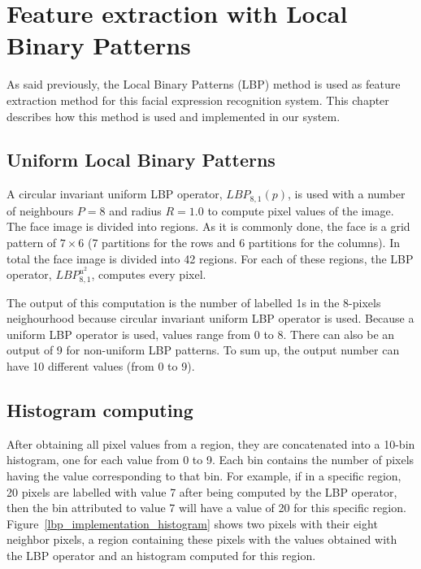 \chapter{Feature extraction with Local Binary Patterns}
\label{chap:implementation_lbp}

\noindent As said previously, the Local Binary Patterns (LBP) method is used as feature extraction method for this facial expression recognition system. This chapter describes how this method is used and implemented in our system.
\newline

\section{Uniform Local Binary Patterns}

\vspace{\baselineskip}
\noindent A circular invariant uniform LBP operator, $ LBP_{8,1}(p) $, is used with a number of neighbours $ P = 8 $ and radius $ R = 1.0 $ to compute pixel values of the image. The face image is divided into regions. As it is commonly done, the face is a grid pattern of $ 7\times6 $ (7 partitions for the rows and 6 partitions for the columns). In total the face image is divided into 42 regions. For each of these regions, the LBP operator, $ LBP_{8,1}^{u^2} $, computes every pixel.
\newline

\noindent The output of this computation is the number of labelled 1s in the 8-pixels neighourhood because circular invariant uniform LBP operator is used. Because a uniform LBP operator is used, values range from 0 to 8. There can also be an output of 9 for non-uniform LBP patterns. To sum up, the output number can have 10 different values (from 0 to 9).
\newline

\section{Histogram computing}

\vspace{\baselineskip}
After obtaining all pixel values from a region, they are concatenated into a 10-bin histogram, one for each value from 0 to 9. Each bin contains the number of pixels having the value corresponding to that bin. For example, if in a specific region, 20 pixels are labelled with value 7 after being computed by the LBP operator, then the bin attributed to value 7 will have a value of 20 for this specific region. Figure~\ref{lbp_implementation_histogram} shows two pixels with their eight neighbor pixels, a region containing these pixels with the values obtained with the LBP operator and an histogram computed for this region.
\newline

